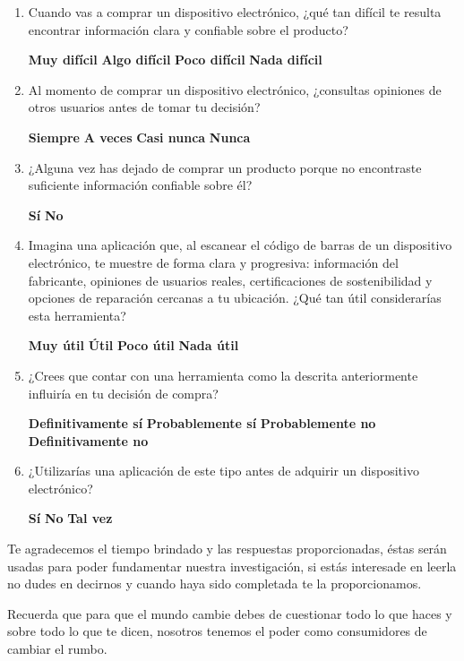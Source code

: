 \begin{enumerate}[resume]

    \item Cuando vas a comprar un dispositivo electrónico, ¿qué tan difícil 
    te resulta encontrar información clara y confiable sobre el producto?
    
    \textbf{Muy difícil} \quad \textbf{Algo difícil} \quad \textbf{Poco difícil} \quad \textbf{Nada difícil}

    \item Al momento de comprar un dispositivo electrónico, ¿consultas 
    opiniones de otros usuarios antes de tomar tu decisión?
    
    \textbf{Siempre} \quad \textbf{A veces} \quad \textbf{Casi nunca} \quad \textbf{Nunca}

    \item ¿Alguna vez has dejado de comprar un producto porque no encontraste 
    suficiente información confiable sobre él?
    
    \textbf{Sí} \quad \textbf{No}

    \item Imagina una aplicación que, al escanear el código de barras de un 
    dispositivo electrónico, te muestre de forma clara y progresiva: 
    información del fabricante, opiniones de usuarios reales, 
    certificaciones de sostenibilidad y opciones de reparación cercanas 
    a tu ubicación. ¿Qué tan útil considerarías esta herramienta?
    
    \textbf{Muy útil} \quad \textbf{Útil} \quad \textbf{Poco útil} \quad \textbf{Nada útil}

    \item ¿Crees que contar con una herramienta como la descrita anteriormente 
    influiría en tu decisión de compra?
    
    \textbf{Definitivamente sí} \quad \textbf{Probablemente sí} \quad 
    \textbf{Probablemente no} \quad \textbf{Definitivamente no}

    \item ¿Utilizarías una aplicación de este tipo antes de adquirir 
    un dispositivo electrónico?
    
    \textbf{Sí} \quad \textbf{No} \quad \textbf{Tal vez}

\end{enumerate}

\noindent Te agradecemos el tiempo brindado y las respuestas proporcionadas, éstas serán
usadas para poder fundamentar nuestra investigación, si estás interesade en
leerla no dudes en decirnos y cuando haya sido completada te la proporcionamos. 

\noindent Recuerda que para que el mundo cambie debes de cuestionar todo lo que haces y
sobre todo lo que te dicen, nosotros tenemos el poder como consumidores de
cambiar el rumbo. 